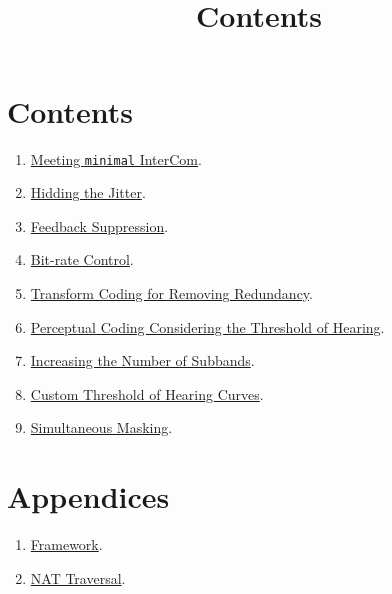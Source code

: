 

\title{\TM{}\\Contents}

\maketitle

\section*{Contents}

\begin{enumerate}
\item \href{https://tecnologias-multimedia.github.io/contents/minimal/}{Meeting \texttt{minimal} InterCom}.
\item \href{https://tecnologias-multimedia.github.io/contents/jitter/}{Hidding the Jitter}.
\item \href{https://tecnologias-multimedia.github.io/contents/feedback_suppression/}{Feedback Suppression}.
\item \href{https://tecnologias-multimedia.github.io/contents/BR_control/}{Bit-rate Control}.
\item \href{https://tecnologias-multimedia.github.io/contents/transform_coding/}{Transform Coding for Removing Redundancy}.
\item \href{https://tecnologias-multimedia.github.io/contents/threshold_of_hearing/}{Perceptual Coding Considering the Threshold of Hearing}.
\item \href{https://tecnologias-multimedia.github.io/contents/higher_subband_resolution/}{Increasing the Number of Subbands}.
\item \href{https://tecnologias-multimedia.github.io/contents/custom_ToH/}{Custom Threshold of Hearing Curves}.
\item \href{https://tecnologias-multimedia.github.io/contents/simultaneous_masking/}{Simultaneous Masking}.
\end{enumerate}

\section*{Appendices}
\begin{enumerate}
\item \href{https://tecnologias-multimedia.github.io/contents/framework/}{Framework}.
\item \href{https://tecnologias-multimedia.github.io/contents/NAT_traversal/}{NAT Traversal}.
\end{enumerate}


%
